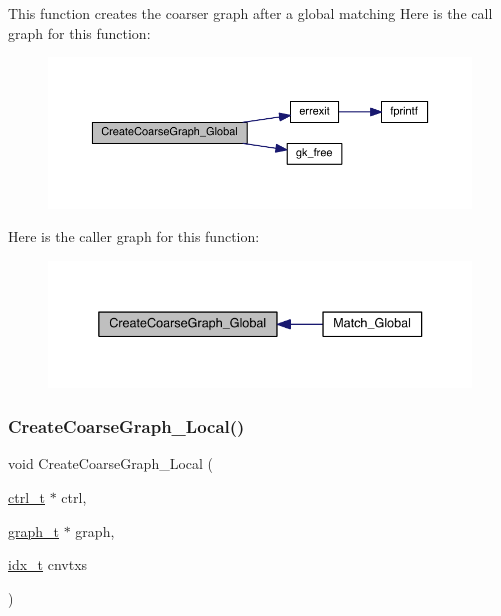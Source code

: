 This function creates the coarser graph after a global matching Here is the call graph for this function\+:\nopagebreak
\begin{figure}[H]
\begin{center}
\leavevmode
\includegraphics[width=350pt]{a00368_afe6fa9bdcdc3b227b06b992caf2aaec4_cgraph}
\end{center}
\end{figure}
Here is the caller graph for this function\+:\nopagebreak
\begin{figure}[H]
\begin{center}
\leavevmode
\includegraphics[width=336pt]{a00368_afe6fa9bdcdc3b227b06b992caf2aaec4_icgraph}
\end{center}
\end{figure}
\mbox{\label{a00368_a5070c68f093e9635e0f2bc1c8630ba27}} 
\subsubsection{\texorpdfstring{Create\+Coarse\+Graph\+\_\+\+Local()}{CreateCoarseGraph\_Local()}}
{\footnotesize\ttfamily void Create\+Coarse\+Graph\+\_\+\+Local (\begin{DoxyParamCaption}\item[{\hyperlink{a00742}{ctrl\+\_\+t} $\ast$}]{ctrl,  }\item[{\hyperlink{a00734}{graph\+\_\+t} $\ast$}]{graph,  }\item[{\hyperlink{a00876_aaa5262be3e700770163401acb0150f52}{idx\+\_\+t}}]{cnvtxs }\end{DoxyParamCaption})}

